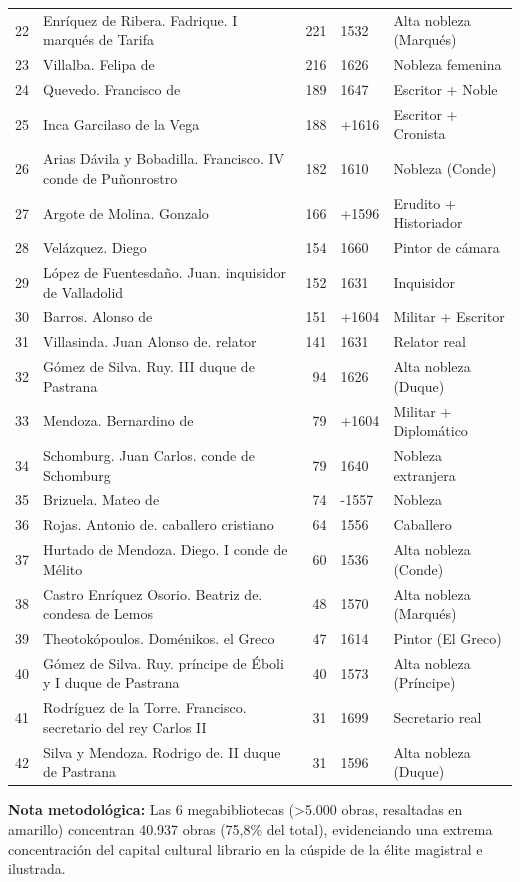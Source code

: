 \begin{longtable}{rlrll}
22 & Enríquez de Ribera. Fadrique. I marqués de Tarifa & 221 & 1532 & Alta nobleza (Marqués) \\
23 & Villalba. Felipa de & 216 & 1626 & Nobleza femenina \\
24 & Quevedo. Francisco de & 189 & 1647 & Escritor + Noble \\
25 & Inca Garcilaso de la Vega & 188 & +1616 & Escritor + Cronista \\
26 & Arias Dávila y Bobadilla. Francisco. IV conde de Puñonrostro & 182 & 1610 & Nobleza (Conde) \\
27 & Argote de Molina. Gonzalo & 166 & +1596 & Erudito + Historiador \\
28 & Velázquez. Diego & 154 & 1660 & Pintor de cámara \\
29 & López de Fuentesdaño. Juan. inquisidor de Valladolid & 152 & 1631 & Inquisidor \\
30 & Barros. Alonso de & 151 & +1604 & Militar + Escritor \\
31 & Villasinda. Juan Alonso de. relator & 141 & 1631 & Relator real \\
32 & Gómez de Silva. Ruy. III duque de Pastrana & 94 & 1626 & Alta nobleza (Duque) \\
33 & Mendoza. Bernardino de & 79 & +1604 & Militar + Diplomático \\
34 & Schomburg. Juan Carlos. conde de Schomburg & 79 & 1640 & Nobleza extranjera \\
35 & Brizuela. Mateo de & 74 & -1557 & Nobleza \\
36 & Rojas. Antonio de. caballero cristiano & 64 & 1556 & Caballero \\
37 & Hurtado de Mendoza. Diego. I conde de Mélito & 60 & 1536 & Alta nobleza (Conde) \\
38 & Castro Enríquez Osorio. Beatriz de. condesa de Lemos & 48 & 1570 & Alta nobleza (Marqués) \\
39 & Theotokópoulos. Doménikos. el Greco & 47 & 1614 & Pintor (El Greco) \\
40 & Gómez de Silva. Ruy. príncipe de Éboli y I duque de Pastrana & 40 & 1573 & Alta nobleza (Príncipe) \\
41 & Rodríguez de la Torre. Francisco. secretario del rey Carlos II & 31 & 1699 & Secretario real \\
42 & Silva y Mendoza. Rodrigo de. II duque de Pastrana & 31 & 1596 & Alta nobleza (Duque) \\
\end{longtable}

\textbf{Nota metodológica:} Las 6 megabibliotecas (>5.000 obras, resaltadas en amarillo) concentran 40.937 obras (75,8\% del total), evidenciando una extrema concentración del capital cultural librario en la cúspide de la élite magistral e ilustrada.
